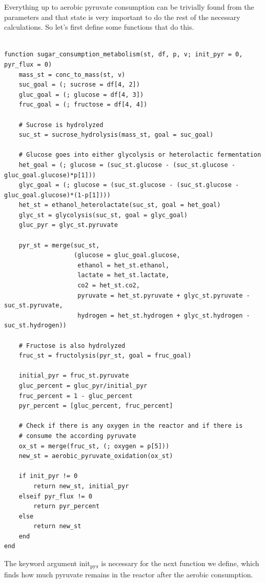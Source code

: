 \documentclass[11pt]{article}
\begin{document}
Everything up to aerobic pyruvate consumption can be trivially found from the parameters and that state is very important to do the rest of the necessary calculations. So let's first define some functions that do this.

\begin{verbatim}

function sugar_consumption_metabolism(st, df, p, v; init_pyr = 0, pyr_flux = 0)
    mass_st = conc_to_mass(st, v)
    suc_goal = (; sucrose = df[4, 2])
    gluc_goal = (; glucose = df[4, 3])
    fruc_goal = (; fructose = df[4, 4])

    # Sucrose is hydrolyzed
    suc_st = sucrose_hydrolysis(mass_st, goal = suc_goal)

    # Glucose goes into either glycolysis or heterolactic fermentation
    het_goal = (; glucose = (suc_st.glucose - (suc_st.glucose - gluc_goal.glucose)*p[1]))
    glyc_goal = (; glucose = (suc_st.glucose - (suc_st.glucose - gluc_goal.glucose)*(1-p[1])))
    het_st = ethanol_heterolactate(suc_st, goal = het_goal)
    glyc_st = glycolysis(suc_st, goal = glyc_goal)
    gluc_pyr = glyc_st.pyruvate

    pyr_st = merge(suc_st,
                   (glucose = gluc_goal.glucose,
                    ethanol = het_st.ethanol,
                    lactate = het_st.lactate,
                    co2 = het_st.co2,
                    pyruvate = het_st.pyruvate + glyc_st.pyruvate - suc_st.pyruvate,
                    hydrogen = het_st.hydrogen + glyc_st.hydrogen - suc_st.hydrogen))

    # Fructose is also hydrolyzed
    fruc_st = fructolysis(pyr_st, goal = fruc_goal)

    initial_pyr = fruc_st.pyruvate
    gluc_percent = gluc_pyr/initial_pyr
    fruc_percent = 1 - gluc_percent
    pyr_percent = [gluc_percent, fruc_percent]

    # Check if there is any oxygen in the reactor and if there is
    # consume the according pyruvate
    ox_st = merge(fruc_st, (; oxygen = p[5]))
    new_st = aerobic_pyruvate_oxidation(ox_st)

    if init_pyr != 0
        return new_st, initial_pyr
    elseif pyr_flux != 0
        return pyr_percent
    else
        return new_st
    end
end

\end{verbatim}

The keyword argument init\textsubscript{pyr} is necessary for the next function we define, which finds how much pyruvate remains in the reactor after the aerobic consumption.
\end{document}
